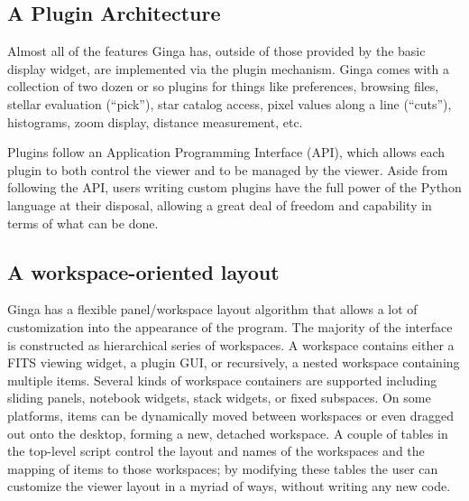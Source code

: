 \subsection{A Plugin Architecture}
Almost all of the features Ginga has, outside of those provided by the basic display widget, are implemented via the plugin mechanism. Ginga comes with a collection of two dozen or so plugins for things like preferences, browsing files, stellar evaluation (``pick''), star catalog access, pixel values along a line (``cuts''), histograms, zoom display, distance measurement, etc.

Plugins follow an Application Programming Interface (API), which allows each plugin to both control the viewer and to be managed by the viewer. Aside from following the API, users writing custom plugins have the full power of the Python language at their disposal, allowing a great deal of freedom and capability in terms of what can be done.   

\subsection{A workspace-oriented layout}
Ginga has a flexible panel/workspace layout algorithm that allows a lot of customization into the appearance of the program.  The majority of the interface is constructed as hierarchical series of workspaces. A workspace contains either a FITS viewing widget, a plugin GUI, or recursively, a nested workspace containing multiple items. Several kinds of workspace containers are supported including sliding panels, notebook widgets, stack widgets, or fixed subspaces. On some platforms, items can be dynamically moved between workspaces or even dragged out onto the desktop, forming a new, detached workspace. A couple of tables in the top-level script control the layout and names of the workspaces and the mapping of items to those workspaces; by modifying these tables the user can customize the viewer layout in a myriad of ways, without writing any new code. 

